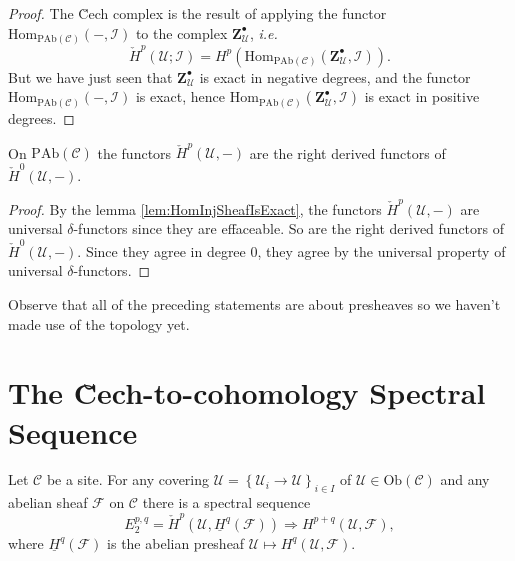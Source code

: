 \begin{proof}
  The \u Cech complex is the result of applying the functor 
$\text{Hom}_{\text{PAb}(\mathcal{C})}(-, \mathcal{I}) $ to the complex $ 
\mathbf{Z}^\bullet_\mathcal{U} $, {\it i.e.}
    $$
    \check H^p(\mathcal{U} ; \mathcal{I}) = H^p 
(\text{Hom}_{\text{PAb}(\mathcal{C})} (\mathbf{Z}^\bullet_\mathcal{U}, 
\mathcal{I})).
    $$
 But we have just seen that $\mathbf{Z}^\bullet_\mathcal{U}$ is exact in 
negative degrees, and the functor $\text{Hom}_{\text{PAb}(\mathcal{C})}(-, 
\mathcal{I})$ is exact, hence $\text{Hom}_{\text{PAb}(\mathcal{C})} 
(\mathbf{Z}^\bullet_\mathcal{U}, \mathcal{I})$ is exact in positive degrees.
\end{proof}
  
\begin{theorem} 
  On $\text{PAb}(\mathcal{C})$ the functors $\check{H}^p(\mathcal{U}, -)$ are 
the right derived functors of $\check{H}^0(\mathcal{U}, -)$.  
\end{theorem}
  
\begin{proof}
 By the lemma \ref{lem:HomInjSheafIsExact}, the functors $\check 
H^p(\mathcal{U}, -)$ are universal $\delta$-functors since they are effaceable. 
 So are the right derived functors of $\check H^0(\mathcal{U}, -)$.  Since they 
agree in degree $0$, they agree by the universal property of universal 
$\delta$-functors.
\end{proof}

\begin{remark}
Observe that all of the preceding statements are about presheaves so we haven't 
made use of the topology yet. 
\end{remark}

\section{The \u Cech-to-cohomology Spectral Sequence}
\label{section-cech-ss}

\begin{theorem}
\label{thm:SpectralSequenceCechToCohom}
Let $\mathcal{C}$ be a site. For any covering $\mathcal{U}= 
\left\{\mathcal{U}_i\to \mathcal{U}\right\}_{i\in I}$ of  $\mathcal{U}\in 
\text{Ob}(\mathcal{C})$ and any abelian sheaf $\mathcal{F}$ on $\mathcal{C}$ 
there is a spectral sequence 
  $$
 E_2^{p, q}
  =
 \check H^p(\mathcal{U},\underline{H}^q(\mathcal{F})) \Rightarrow 
H^{p+q}(\mathcal{U}, \mathcal{F}),
$$
    where $\underline{H}^q(\mathcal{F})$ is the abelian presheaf  
$\mathcal{U}\mapsto H^q(\mathcal{U}, \mathcal{F})$.  
\end{theorem}
  
